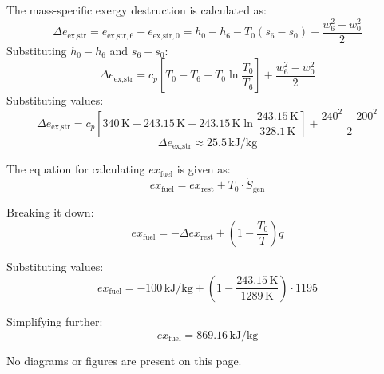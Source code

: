 The mass-specific exergy destruction is calculated as:  
\[
\Delta e_{\text{ex,str}} = e_{\text{ex,str},6} - e_{\text{ex,str},0} = h_0 - h_6 - T_0 (s_6 - s_0) + \frac{w_6^2 - w_0^2}{2}
\]  
Substituting \( h_0 - h_6 \) and \( s_6 - s_0 \):  
\[
\Delta e_{\text{ex,str}} = c_p \left[ T_0 - T_6 - T_0 \ln \frac{T_0}{T_6} \right] + \frac{w_6^2 - w_0^2}{2}
\]  
Substituting values:  
\[
\Delta e_{\text{ex,str}} = c_p \left[ 340 \, \text{K} - 243.15 \, \text{K} - 243.15 \, \text{K} \ln \frac{243.15 \, \text{K}}{328.1 \, \text{K}} \right] + \frac{240^2 - 200^2}{2}
\]  
\[
\Delta e_{\text{ex,str}} \approx 25.5 \, \text{kJ/kg}
\]

The equation for calculating \( ex_{\text{fuel}} \) is given as:  
\[
ex_{\text{fuel}} = ex_{\text{rest}} + T_0 \cdot \dot{S}_{\text{gen}}
\]  

Breaking it down:  
\[
ex_{\text{fuel}} = -\Delta ex_{\text{rest}} + \left( 1 - \frac{T_0}{T} \right) q
\]  

Substituting values:  
\[
ex_{\text{fuel}} = -100 \, \text{kJ/kg} + \left( 1 - \frac{243.15 \, \text{K}}{1289 \, \text{K}} \right) \cdot 1195
\]  

Simplifying further:  
\[
ex_{\text{fuel}} = 869.16 \, \text{kJ/kg}
\]  

No diagrams or figures are present on this page.